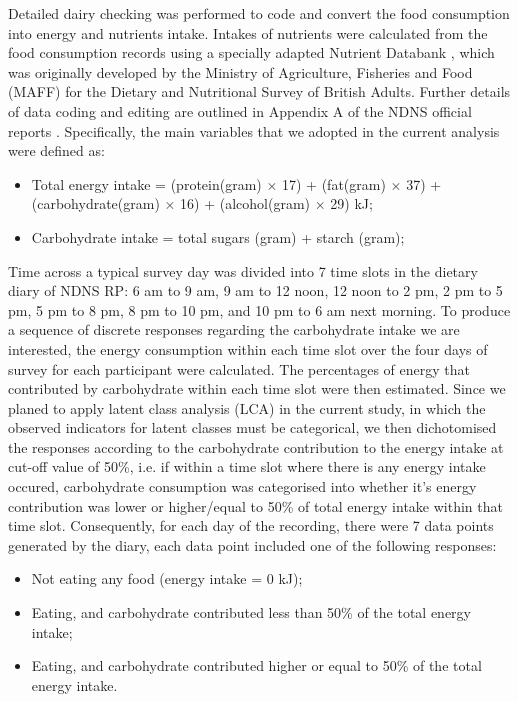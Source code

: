 Detailed dairy checking was performed to code and convert the food consumption into energy and nutrients intake. Intakes of nutrients were calculated from the food consumption records using a specially adapted Nutrient Databank \parencite{smithers1993maff}, which was originally developed by the Ministry of Agriculture, Fisheries and Food (MAFF) for the Dietary and Nutritional Survey of British Adults. Further details of data
coding and editing are outlined in Appendix A of the NDNS official reports \parencite{NDNSofficial}. Specifically, the main variables that we adopted in the current analysis were defined as: 

\begin{itemize}
	\item Total energy intake = (protein(gram) $\times$ 17) + (fat(gram) $\times$ 37) + (carbohydrate(gram) $\times$ 16) + (alcohol(gram) $\times$ 29)  kJ;
	\item Carbohydrate intake = total sugars (gram) + starch (gram); 
\end{itemize}

Time across a typical survey day was divided into 7 time slots in the dietary diary of NDNS RP: 6 am to 9 am, 9 am to 12 noon, 12 noon to 2 pm, 2 pm to 5 pm, 5 pm to 8 pm, 8 pm to 10 pm, and 10 pm to 6 am next morning. To produce a sequence of discrete responses regarding the carbohydrate intake we are interested, the energy consumption within each time slot over the four days of survey for each participant were calculated. The percentages of energy that contributed by carbohydrate within each time slot were then estimated. Since we planed to apply latent class analysis (LCA) in the current study, in which the observed indicators for latent classes must be categorical, we then dichotomised the responses according to the carbohydrate contribution to the energy intake at cut-off value of 50\%, i.e. if within a time slot where there is any energy intake occured, carbohydrate consumption was categorised into whether it's energy contribution was lower or higher/equal to 50\% of total energy intake within that time slot. Consequently, for each day of the recording, there were 7 data points generated by the diary, each data point included one of the following responses:

\begin{itemize}
	\item Not eating any food (energy intake = 0 kJ); 
	\item Eating, and carbohydrate contributed less than 50\% of the total energy intake;
	\item Eating, and carbohydrate contributed higher or equal to 50\% of the total energy intake.
\end{itemize}
\vspace{-0.5cm}


